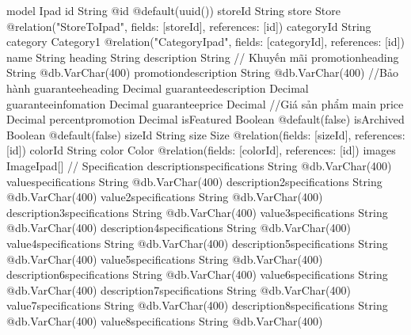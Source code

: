 model Ipad {
  id                          String                     @id @default(uuid())
  storeId                     String
  store                       Store                      @relation("StoreToIpad", fields: [storeId], references: [id])
  categoryId              String
  category                Category1                  @relation("CategoryIpad", fields: [categoryId], references: [id])
  name                        String
  heading                     String
  description                 String
  // Khuyến mãi
  promotionheading            String                     @db.VarChar(400)
  promotiondescription        String                     @db.VarChar(400)
  //Bảo hành
  guaranteeheading            Decimal
  guaranteedescription        Decimal
  guaranteeinfomation         Decimal
  guaranteeprice              Decimal
  //Giá sản phẩm main
  price                       Decimal
  percentpromotion            Decimal
  isFeatured                  Boolean                    @default(false)
  isArchived                  Boolean                    @default(false)
  sizeId                      String
  size                        Size                       @relation(fields: [sizeId], references: [id])
  colorId                     String
  color                       Color                      @relation(fields: [colorId], references: [id])
  images                  ImageIpad[]
  // Specification
  descriptionspecifications   String                     @db.VarChar(400)
  valuespecifications         String                     @db.VarChar(400)
  description2specifications  String                     @db.VarChar(400)
  value2specifications        String                     @db.VarChar(400)
  description3specifications  String                     @db.VarChar(400)
  value3specifications        String                     @db.VarChar(400)
  description4specifications  String                     @db.VarChar(400)
  value4specifications        String                     @db.VarChar(400)
  description5specifications  String                     @db.VarChar(400)
  value5specifications        String                     @db.VarChar(400)
  description6specifications  String                     @db.VarChar(400)
  value6specifications        String                     @db.VarChar(400)
  description7specifications  String                     @db.VarChar(400)
  value7specifications        String                     @db.VarChar(400)
  description8specifications  String                     @db.VarChar(400)
  value8specifications        String                     @db.VarChar(400)
}
